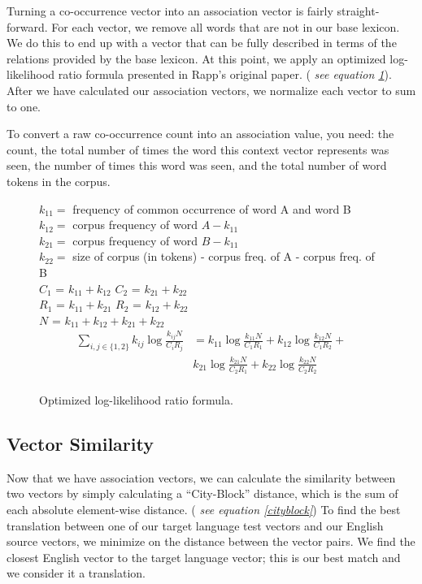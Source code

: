 \documentclass[12pt]{article}
\begin{document}
Turning a co-occurrence vector into an association vector is fairly straight-forward. For each vector, we remove all words that are not in our base lexicon. We do this to end up with a vector that can be fully described in terms of the relations provided by the base lexicon. At this point, we apply an optimized log-likelihood ratio formula presented in Rapp's original paper. (\emph{ see equation \ref{loglike}}). After we have calculated our association vectors, we normalize each vector to sum to one.

To convert a raw co-occurrence count into an association value, you need: the count, the total number of times the word this context vector represents was seen, the number of times this word was seen, and the total number of word tokens in the corpus.

\begin{figure}
$k_{11} =$ frequency of common occurrence of word A and word B \\
$k_{12} =$ corpus frequency of word $A - k_{11}$ \\
$k_{21} =$ corpus frequency of word $B - k_{11}$ \\
$k_{22} =$ size of corpus (in tokens) - corpus freq. of A - corpus freq. of B \\

$C_1$ = $k_{11} + k_{12}$
$C_2$ = $k_{21} + k_{22}$ \\
$R_1$ = $k_{11} + k_{21}$
$R_2$ = $k_{12} + k_{22}$ \\
$N$ = $k_{11} + k_{12} + k_{21} + k_{22}$ \\

  \begin{eqnarray*}
\sum_{i,j\in\{1,2\}} k_{ij}\log\frac{k_{ij}N}{C_iR_j} &= k_{11}\log\frac{k_{11}N}{C_1R_1} +  k_{12}\log\frac{k_{12}N}{C_1R_2} + \\
  & k_{21}\log\frac{k_{21}N}{C_2R_1} +  k_{22}\log\frac{k_{22}N}{C_2R_2} \\
  \end{eqnarray*}

  \caption{Optimized log-likelihood ratio formula.}
  \label{loglike}
\end{figure}


\subsection{Vector Similarity}

Now that we have association vectors, we can calculate the similarity between two vectors by simply calculating a ``City-Block'' distance, which is the sum of each absolute element-wise distance. (\emph{ see equation \ref{cityblock}}) To find the best translation between one of our target language test vectors and our English source vectors, we minimize on the distance between the vector pairs. We find the closest English vector to the target language vector; this is our best match and we consider it a translation.
\end{document}
